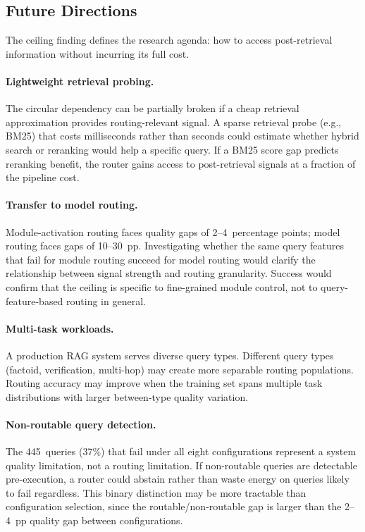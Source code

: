 \subsection{Future Directions}
\label{subsec:future}

The ceiling finding defines the research agenda: how to access
post-retrieval information without incurring its full cost.

\paragraph{Lightweight retrieval probing.}
The circular dependency can be partially broken if a cheap retrieval
approximation provides routing-relevant signal.  A sparse retrieval
probe (e.g., BM25) that costs milliseconds rather than seconds could
estimate whether hybrid search or reranking would help a specific query.
If a BM25 score gap predicts reranking benefit, the router gains access
to post-retrieval signals at a fraction of the pipeline cost.

\paragraph{Transfer to model routing.}
Module-activation routing faces quality gaps of 2--4~percentage points;
model routing faces gaps of 10--30~pp.  Investigating whether the same
query features that fail for module routing succeed for model routing
would clarify the relationship between signal strength and routing
granularity.  Success would confirm that the ceiling is specific to
fine-grained module control, not to query-feature-based routing in
general.

\paragraph{Multi-task workloads.} A production RAG system serves diverse query types.  Different query
types (factoid, verification, multi-hop) may create more separable
routing populations.  Routing accuracy may improve when the training
set spans multiple task distributions with larger between-type
quality variation.

\paragraph{Non-routable query detection.} The 445~queries (37\%) that fail under all eight configurations represent
a system quality limitation, not a routing limitation.  If non-routable
queries are detectable pre-execution, a router could abstain rather than
waste energy on queries likely to fail regardless.  This binary
distinction may be more tractable than configuration selection, since the
routable/non-routable gap is larger than the 2--4~pp quality gap between
configurations.

